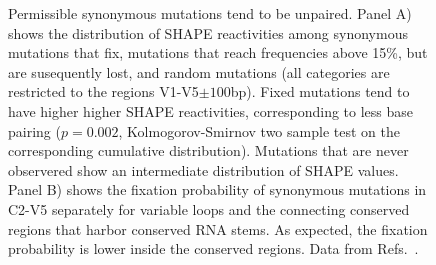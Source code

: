 \documentclass[rmp, twocolumn]{revtex4}
\begin{document}
\begin{figure}
\begin{center}
\caption{Permissible synonymous mutations tend to be unpaired.
Panel A) shows the distribution of SHAPE reactivities among synonymous mutations
that fix, mutations that reach frequencies above 15\%, but
are susequently lost, and random mutations (all categories are restricted to the
regions V1-V5$\pm 100$bp).
Fixed mutations tend to have higher higher SHAPE reactivities, corresponding to
less base pairing ($p=0.002$, Kolmogorov-Smirnov two sample test on the
corresponding cumulative distribution).
Mutations that are never observered show an intermediate distribution of SHAPE values.
Panel B) shows the fixation probability of synonymous mutations in C2-V5
separately for variable loops and the connecting conserved regions that
harbor conserved RNA stems. As expected, the fixation probability is lower
inside the conserved regions. Data from Refs.~\cite{shankarappa_consistent_1999,
bunnik_autologous_2008, liu_selection_2006}.}
\label{fig:SHAPE}
\end{center}
\end{figure}
\end{document}
